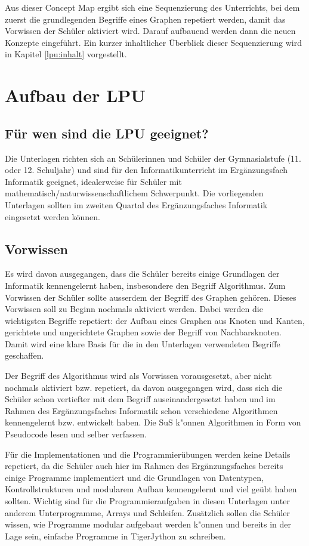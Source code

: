 Aus dieser Concept Map ergibt sich eine Sequenzierung des Unterrichts, bei dem zuerst die grundlegenden Begriffe eines Graphen repetiert werden, damit das Vorwissen der Sch\"uler aktiviert wird. Darauf aufbauend werden dann die neuen Konzepte eingef\"uhrt. Ein kurzer inhaltlicher \"Uberblick dieser Sequenzierung wird in Kapitel \ref{lpu:inhalt} vorgestellt.

\section{Aufbau der LPU}

\subsection{F\"ur wen sind die LPU geeignet?}
Die Unterlagen richten sich an Sch\"ulerinnen und Sch\"uler der Gymnasialstufe (11. oder 12. Schuljahr) und sind f\"ur den Informatikunterricht im Erg\"anzungsfach Informatik geeignet, idealerweise f\"ur Sch\"uler mit mathematisch/naturwissenschaftlichem Schwerpunkt. 
Die vorliegenden Unterlagen sollten im zweiten Quartal des Erg\"anzungsfaches Informatik eingesetzt werden k\"onnen.


\subsection{Vorwissen}

Es wird davon ausgegangen, dass die Sch\"uler bereits einige Grundlagen der Informatik kennengelernt haben, insbesondere den Begriff Algorithmus. Zum Vorwissen der Sch\"uler sollte ausserdem der Begriff des Graphen geh\"oren. Dieses Vorwissen soll zu Beginn nochmals aktiviert werden. Dabei werden die wichtigsten Begriffe repetiert: der Aufbau eines Graphen aus Knoten und Kanten, gerichtete und ungerichtete Graphen sowie der Begriff von Nachbarsknoten. Damit wird eine klare Basis f\"ur die in den Unterlagen verwendeten Begriffe geschaffen.

Der Begriff des Algorithmus wird als Vorwissen vorausgesetzt, aber nicht nochmals aktiviert bzw. repetiert, da davon ausgegangen wird, dass sich die Sch\"uler schon vertiefter mit dem Begriff auseinandergesetzt haben und im Rahmen des Erg\"anzungsfaches Informatik schon verschiedene Algorithmen kennengelernt bzw. entwickelt haben. 
Die SuS k"onnen Algorithmen in Form von Pseudocode lesen und selber verfassen.


F\"ur die Implementationen und die Programmier\"ubungen werden keine Details repetiert, da die Sch\"uler auch hier im Rahmen des Erg\"anzungsfaches bereits einige Programme implementiert und die Grundlagen von Datentypen, Kontrollstrukturen und modularem Aufbau kennengelernt und viel ge\"ubt haben sollten. 
Wichtig sind f\"ur die Programmieraufgaben in diesen Unterlagen unter anderem Unterprogramme, Arrays und Schleifen.
Zus\"atzlich sollen die Sch\"uler  wissen, wie Programme modular aufgebaut werden k"onnen und bereits in der Lage sein, einfache Programme in TigerJython zu schreiben. 

